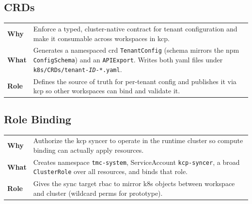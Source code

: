 \documentclass[11pt, a4paper, oneside, listof=totoc]{scrartcl}
\makeatletter
\newcommand{\codesummary}[3]{%
    \vspace{0.4\baselineskip}%
    \noindent\begin{tabularx}{\linewidth}{@{}>{\bfseries}l X@{}}
    Why  & #1\\
    What & #2\\
    Role & #3\\
    \end{tabularx}%
    \vspace{0.2\baselineskip}%
}
\makeatother
\begin{document}
        \clearpage

            \subsection{CRDs}
                \codesummary
                    {Enforce a typed, cluster-native contract for tenant configuration and make it consumable across workspaces in \gls{kcp}.}
                    {Generates a namespaced \gls{crd} \texttt{TenantConfig} (schema mirrors the \gls{npm} \texttt{ConfigSchema}) and an \texttt{APIExport}. Writes both \gls{yaml} files under \texttt{k8s/CRDs/tenant-\textit{ID}-*.yaml}.}
                    {Defines the source of truth for per-tenant config and publishes it via \gls{kcp} so other workspaces can bind and validate it.}
        \clearpage

            \subsection{Role Binding}
                \codesummary
                    {Authorize the \gls{kcp} syncer to operate in the runtime cluster so compute binding can actually apply resources.}
                    {Creates namespace \texttt{tmc-system}, ServiceAccount \texttt{kcp-syncer}, a broad \texttt{ClusterRole} over all resources, and binds that role.}
                    {Gives the sync target \gls{rbac} to mirror \gls{k8s} objects between workspace and cluster (wildcard perms for prototype).}
\end{document}
